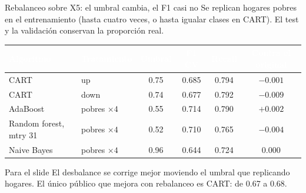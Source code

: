 \documentclass[aspectratio=169,10pt]{beamer}
\newcommand{\fila}{\rowcolor{rowAlt}}
\newcommand{\hh}[1]{\cellcolor{uniandesInk}\textcolor{white}{\textbf{#1}}}
\begin{document}
\begin{frame}{Rebalanceo sobre X5: el umbral cambia, el F1 casi no}
  Se replican hogares pobres en el entrenamiento (hasta cuatro veces, o hasta igualar clases en CART). El test y la validación conservan la proporción real.
  \vspace{0.4em}
  \footnotesize
  \begin{center}
  \begin{tabular}{@{}llcccc@{}}
    \toprule
    \hh{Algoritmo} & \hh{Tratamiento} & \hh{Umbral} & \hh{F1 CV} & \hh{Recall} & \hh{Contra el original} \\
    \midrule
    CART & up & 0.75 & 0.685 & 0.794 & $-0.001$ \\
    \fila CART & down & 0.74 & 0.677 & 0.792 & $-0.009$ \\
    AdaBoost & pobres $\times 4$ & 0.55 & 0.714 & 0.790 & $+0.002$ \\
    \fila Random forest, mtry 31 & pobres $\times 4$ & 0.52 & 0.710 & 0.765 & $-0.004$ \\
    Naive Bayes & pobres $\times 4$ & 0.96 & 0.644 & 0.724 & $0.000$ \\
    \bottomrule
  \end{tabular}
  \end{center}
  \vspace{0.55em}
  \begin{block}{Para el slide}
    El desbalance se corrige mejor moviendo el umbral que replicando hogares. El único público que mejora con rebalanceo es CART: de 0.67 a 0.68.
  \end{block}
\end{frame}
\end{document}
